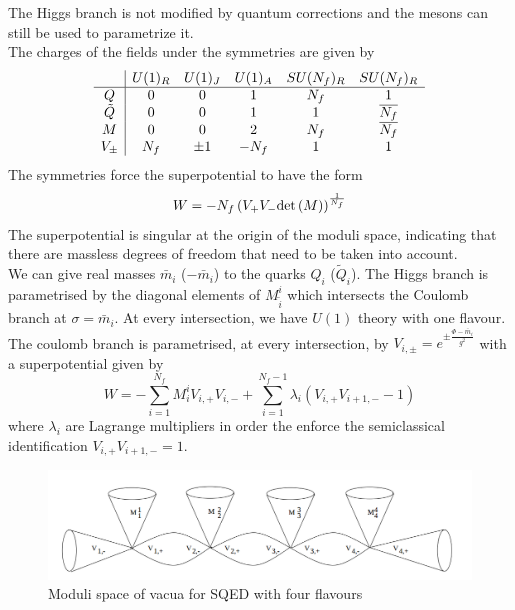 The Higgs branch is not modified by quantum corrections and the mesons can still be used to parametrize it.\\
The charges of the fields under the symmetries are given by
 \begin{equation}
 \begin{array}{ c | c c c c c }
  & U(1)_R &  U(1)_J & U(1)_A & SU(N_f)_R & SU(N_f)_R \\
 \hline
 Q & 0 & 0  & 1 & N_f & 1  \\  
 \tilde{Q} & 0 & 0  & 1 & 1 & \overline{N_f}  \\  
   M & 0 &  0 & 2 & N_f & \overline{N_f}\\  
   V_{\pm} & N_f & \pm 1  & -N_f & 1  &  1\\
 \end{array}
\end{equation}
The symmetries force the superpotential to have the form
\begin{equation}
W = - N_f \left(  V_+ V_- \mathrm{det } \,{ (M)} \right)^{\frac{1}{N_f}}
\end{equation}
The superpotential is singular at the origin of the moduli space, indicating that there are massless degrees of freedom that need to be taken into account.\\
We can give real masses $\bar{m}_i$ ($-\bar{m}_i$) to the quarks $Q_i$ ($\tilde{Q}_i$).
The Higgs branch is parametrised by the diagonal elements of $M^i_{\tilde{i}}$ which intersects the Coulomb branch at $\sigma = \bar{m}_i$.
At every intersection, we have $U(1)$ theory with one flavour.
The coulomb branch is parametrised, at every intersection, by $V_{i,\pm} = e^{\pm \frac{\Phi - \bar{m}_i}{g^2}} $ with a superpotential given by
\begin{equation}
W = - \sum_{i = 1}^{N_f} M^i_i V_{i,+} V_{i,-} + \sum_{i=1}^{N_f - 1} \lambda_i \left(    V_{i,+} V_{i+1,-} - 1\right)
\end{equation}
where $\lambda_i$ are Lagrange multipliers in order the enforce the semiclassical identification  $ V_{i,+} V_{i+1,-} = 1 $.

\begin{figure}[h!]
\centering
\includegraphics[scale=0.5]{u1_moduli_space_flavours.png}
\caption{Moduli space of vacua for SQED with four flavours}
\end{figure}















